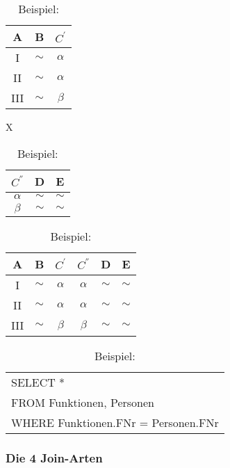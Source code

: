 \documentclass{article}
\begin{document}
\begin{table}[!htbp]
  \center
  \begin{tabular}{c|c|c}
    A            & B      & $C^{'}$  \\
    \hline
    \textrm{I}   & $\sim$ & $\alpha$ \\
    \textrm{II}  & $\sim$ & $\alpha$ \\
    \textrm{III} & $\sim$ & $\beta$  \\
  \end{tabular}
  \quad
  X
  \quad
  \begin{tabular}{c|c|c}
    $C^{''}$ & D      & E      \\
    \hline
    $\alpha$ & $\sim$ & $\sim$ \\
    $\beta$  & $\sim$ & $\sim$ \\
  \end{tabular}

  \vspace{1.2em}
  \begin{tabular}{c|c|c|c|c|c}
    A            & B      & $C^{'}$  & $C^{''}$ & D      & E      \\
    \hline
    \textrm{I}   & $\sim$ & $\alpha$ & $\alpha$ & $\sim$ & $\sim$ \\
    \textrm{II}  & $\sim$ & $\alpha$ & $\alpha$ & $\sim$ & $\sim$ \\
    \textrm{III} & $\sim$ & $\beta$  & $\beta$  & $\sim$ & $\sim$ \\
  \end{tabular}
  \quad
  \begin{tabular}{l}
    SELECT *                  \\
    FROM Funktionen, Personen \\
    WHERE Funktionen.FNr = Personen.FNr
  \end{tabular}
  \label{tab:join:2}
  \caption{Beispiel: \protect{}}
\end{table}

\newpage
\subsubsection{Die 4 Join-Arten}
\end{document}
